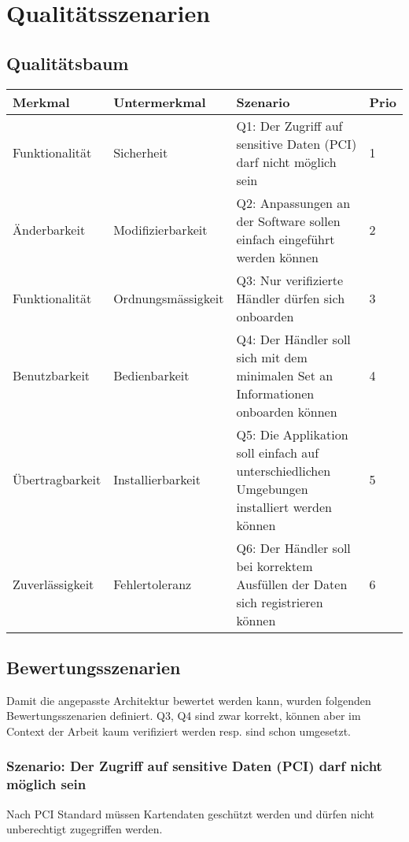 \chapter{Qualitätsszenarien}
\label{sec:qualityscenarios}

\section{Qualitätsbaum}
\begin{table}[H]
	\centering
	\begin{tabular}{ | p{3cm} | p{3.5cm} | p{6.5cm} | p{1cm} | }
		\toprule
		{\textbf{Merkmal}} & {\textbf{Untermerkmal}} & {\textbf{Szenario}} & {\textbf{Prio}} \\
		\midrule
		Funktionalität & Sicherheit & Q1: Der Zugriff auf sensitive Daten (PCI) darf nicht möglich sein & 1 \\ \hline
		Änderbarkeit & Modifizierbarkeit & Q2: Anpassungen an der Software sollen einfach eingeführt werden können & 2 \\ \hline
		Funktionalität & Ordnungsmässigkeit & Q3: Nur verifizierte Händler dürfen sich onboarden & 3 \\ \hline
		Benutzbarkeit & Bedienbarkeit & Q4: Der Händler soll sich mit dem minimalen Set an Informationen onboarden können & 4 \\ \hline
		Übertragbarkeit & Installierbarkeit & Q5: Die Applikation soll einfach auf unterschiedlichen Umgebungen installiert werden können & 5 \\ \hline
		Zuverlässigkeit & Fehlertoleranz & Q6: Der Händler soll bei korrektem Ausfüllen der Daten sich registrieren können & 6 \\
		\bottomrule
	\end{tabular}
\end{table}
\newpage
\section{Bewertungsszenarien}

Damit die angepasste Architektur bewertet werden kann, wurden folgenden Bewertungsszenarien definiert. 
Q3, Q4 sind zwar korrekt, können aber im Context der Arbeit kaum verifiziert werden resp. sind schon umgesetzt.

\subsection{Szenario: Der Zugriff auf sensitive Daten (PCI) darf nicht möglich sein}
Nach PCI Standard müssen Kartendaten geschützt werden und dürfen nicht unberechtigt zugegriffen werden.

